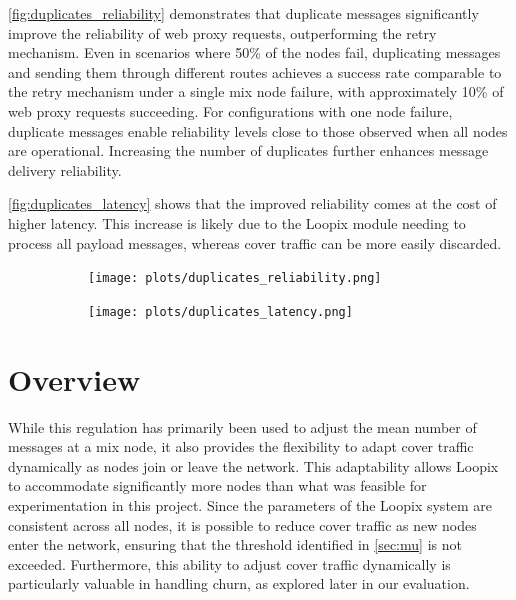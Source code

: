 \documentclass[a4paper,11pt,oneside]{report}
\begin{document}
\autoref{fig:duplicates_reliability} demonstrates that duplicate messages significantly improve the reliability of web proxy requests, outperforming the retry mechanism. Even in scenarios where 50\% of the nodes fail, duplicating messages and sending them through different routes achieves a success rate comparable to the retry mechanism under a single mix node failure, with approximately 10\% of web proxy requests succeeding. For configurations with one node failure, duplicate messages enable reliability levels close to those observed when all nodes are operational. Increasing the number of duplicates further enhances message delivery reliability.

\autoref{fig:duplicates_latency} shows that the improved reliability comes at the cost of higher latency. This increase is likely due to the Loopix module needing to process all payload messages, whereas cover traffic can be more easily discarded.

\begin{figure}[H]
    \centering
    \begin{subfigure}{\textwidth}
        \centering
        \texttt{[image: plots/duplicates\_reliability.png]}
        \caption{}
        \label{fig:duplicates_reliability}
    \end{subfigure}
    \hfill
    \centering
    \begin{subfigure}{\textwidth}
        \centering
        \texttt{[image: plots/duplicates\_latency.png]}
        \caption{}
        \label{fig:duplicates_latency}
    \end{subfigure}
\end{figure}

\section{Overview}
While this regulation has primarily been used to adjust the mean number of messages at a mix node, it also provides the flexibility to adapt cover traffic dynamically as nodes join or leave the network. This adaptability allows Loopix to accommodate significantly more nodes than what was feasible for experimentation in this project. Since the parameters of the Loopix system are consistent across all nodes, it is possible to reduce cover traffic as new nodes enter the network, ensuring that the threshold identified in \autoref{sec:mu} is not exceeded. Furthermore, this ability to adjust cover traffic dynamically is particularly valuable in handling churn, as explored later in our evaluation.
\end{document}
